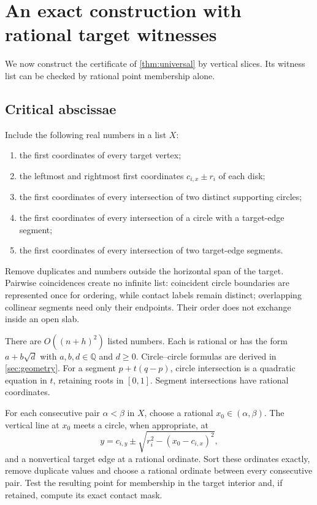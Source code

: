 \section{An exact construction with rational target witnesses}
\label{sec:target-algorithm}
We now construct the certificate of \cref{thm:universal} by vertical slices. Its witness list can be checked by rational point membership alone.

\subsection{Critical abscissae}
Include the following real numbers in a list $X$:
\begin{enumerate}
\item the first coordinates of every target vertex;
\item the leftmost and rightmost first coordinates $c_{i,x}\pm r_i$ of each disk;
\item the first coordinates of every intersection of two distinct supporting circles;
\item the first coordinates of every intersection of a circle with a target-edge segment;
\item the first coordinates of every intersection of two target-edge segments.
\end{enumerate}
Remove duplicates and numbers outside the horizontal span of the target. Pairwise coincidences create no infinite list: coincident circle boundaries are represented once for ordering, while contact labels remain distinct; overlapping collinear segments need only their endpoints. Their order does not exchange inside an open slab.

There are $O((n+h)^2)$ listed numbers. Each is rational or has the form $a+b\sqrt d$ with $a,b,d\in\mathbb Q$ and $d\ge0$. Circle--circle formulas are derived in \cref{sec:geometry}. For a segment $p+t(q-p)$, circle intersection is a quadratic equation in $t$, retaining roots in $[0,1]$. Segment intersections have rational coordinates.

For each consecutive pair $\alpha<\beta$ in $X$, choose a rational $x_0\in(\alpha,\beta)$. The vertical line at $x_0$ meets a circle, when appropriate, at
\[
y=c_{i,y}\pm\sqrt{r_i^2-(x_0-c_{i,x})^2},
\]
and a nonvertical target edge at a rational ordinate. Sort these ordinates exactly, remove duplicate values and choose a rational ordinate between every consecutive pair. Test the resulting point for membership in the target interior and, if retained, compute its exact contact mask.

